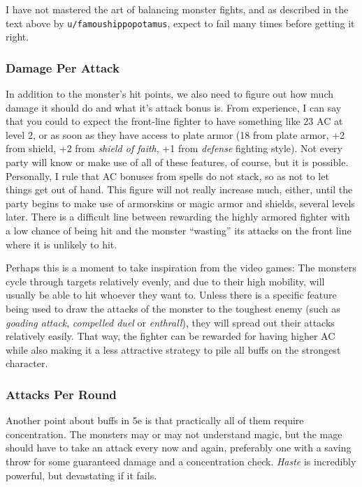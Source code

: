 I have not mastered the art of balancing monster fights, and as described in the text above by \texttt{u/famoushippopotamus}, expect to fail many times before getting it right.

\subsubsection{Damage Per Attack}
In addition to the monster's hit points, we also need to figure out how much damage it should do and what it's attack bonus is. From experience, I can say that you could to expect the front-line fighter to have something like 23 AC at level 2, or as soon as they have access to plate armor (18 from plate armor, +2 from shield, +2 from \emph{shield of faith}, +1 from \emph{defense} fighting style). Not every party will know or make use of all of these features, of course, but it is possible. Personally, I rule that AC bonuses from spells do not stack, so as not to let things get out of hand. This figure will not really increase much, either, until the party begins to make use of armorskins or magic armor and shields, several levels later. There is a difficult line between rewarding the highly armored fighter with a low chance of being hit and the monster ``wasting'' its attacks on the front line where it is unlikely to hit.

Perhaps this is a moment to take inspiration from the video games: The monsters cycle through targets relatively evenly, and due to their high mobility, will usually be able to hit whoever they want to. Unless there is a specific feature being used to draw the attacks of the monster to the toughest enemy (such as \emph{goading attack}, \emph{compelled duel} or \emph{enthrall}), they will spread out their attacks relatively easily. That way, the fighter can be rewarded for having higher AC while also making it a less attractive strategy to pile all buffs on the strongest character.

\subsubsection{Attacks Per Round}
Another point about buffs in 5e is that practically all of them require concentration. The monsters may or may not understand magic, but the mage should have to take an attack every now and again, preferably one with a saving throw for some guaranteed damage and a concentration check. \emph{Haste} is incredibly powerful, but devastating if it fails.

